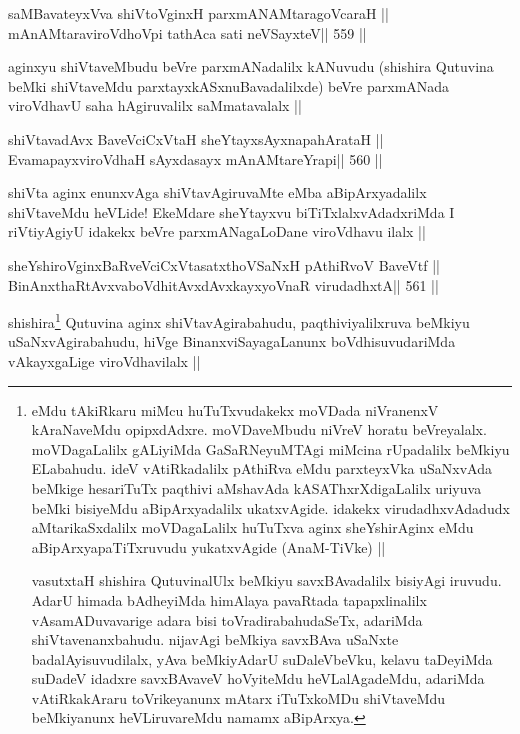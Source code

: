 \begin{shl}
saMBavateyxVva shiVtoV\s ginxH parxmANAMtaragoVcaraH ||
mAnAMtaraviroVdhoV\s pi tathAca sati neVSayxteV\hfill || 559 ||
\end{shl}

\begin{artha}
aginxyu shiVtaveMbudu beVre parxmANadalilx kANuvudu (shishira Qutuvina
beMki shiVtaveMdu parxtayxkASxnuBavadalilxde) beVre parxmANada
viroVdhavU saha hAgiruvalilx saMmatavalalx ||
\end{artha}

\begin{shl}
shiVtavadAvx BaveVciCxVtaH sheYtayxsAyxnapahArataH ||
EvamapayxviroVdhaH sAyxdasayx mAnAMtareYrapi\hfill || 560 ||
\end{shl}

\begin{artha}
shiVta aginx enunxvAga shiVtavAgiruvaMte eMba aBipArxyadalilx
shiVtaveMdu heVLide! EkeMdare sheYtayxvu biTiTxlalxvAdadxriMda I
riVtiyAgiyU idakekx beVre parxmANagaLoDane viroVdhavu ilalx ||
\end{artha}

\begin{shl}
sheYshiroV\s ginxBaRveVciCxVtasatxthoVSaNxH pAthiRvoV BaveVtf ||
BinAnxthaRtAvxvaboVdhitAvxdAvxkayxyoVnaR virudadhxtA\hfill || 561 ||
\end{shl}

\begin{artha}
shishira\footnote[1]{eMdu tAkiRkaru miMcu huTuTxvudakekx moVDada niVranenxV
kAraNaveMdu opipxdAdxre. moVDaveMbudu niVreV horatu beVreyalalx.
moVDagaLalilx gALiyiMda GaSaRNeyuMTAgi miMcina rUpadalilx beMkiyu
ELabahudu. ideV vAtiRkadalilx pAthiRva eMdu parxteyxVka uSaNxvAda
beMkige hesariTuTx paqthivi aMshavAda kASAThxrXdigaLalilx uriyuva beMki
bisiyeMdu aBipArxyadalilx ukatxvAgide. idakekx virudadhxvAdadudx
aMtarikaSxdalilx moVDagaLalilx huTuTxva aginx sheYshirAginx eMdu
aBipArxyapaTiTxruvudu yukatxvAgide (AnaM-TiVke) ||

vasutxtaH shishira QutuvinalUlx beMkiyu savxBAvadalilx bisiyAgi
iruvudu. AdarU himada bAdheyiMda himAlaya pavaRtada tapapxlinalilx
vAsamADuvavarige adara bisi toVradirabahudaSeTx, adariMda
shiVtavenanxbahudu. nijavAgi beMkiya savxBAva uSaNxte
badalAyisuvudilalx, yAva beMkiyAdarU suDaleVbeVku, kelavu taDeyiMda
suDadeV idadxre savxBAvaveV hoVyiteMdu heVLalAgadeMdu, adariMda
vAtiRkakAraru toVrikeyanunx mAtarx iTuTxkoMDu shiVtaveMdu beMkiyanunx
heVLiruvareMdu namamx aBipArxya.} Qutuvina aginx shiVtavAgirabahudu, paqthiviyalilxruva beMkiyu
uSaNxvAgirabahudu, hiVge BinanxviSayagaLanunx boVdhisuvudariMda
vAkayxgaLige viroVdhavilalx ||
\end{artha}

